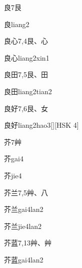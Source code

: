 \begin{Entry}{良}{7}{⾉}
  \begin{Phonetics}{良}{liang2}
  \end{Phonetics}
\end{Entry}

\begin{Entry}{良心}{7,4}{⾉、⼼}
  \begin{Phonetics}{良心}{liang2xin1}
  \end{Phonetics}
\end{Entry}

\begin{Entry}{良田}{7,5}{⾉、⽥}
  \begin{Phonetics}{良田}{liang2tian2}
  \end{Phonetics}
\end{Entry}

\begin{Entry}{良好}{7,6}{⾉、⼥}
  \begin{Phonetics}{良好}{liang2hao3}[][HSK 4]
  \end{Phonetics}
\end{Entry}

\begin{Entry}{芥}{7}{⾋}
  \begin{Phonetics}{芥}{gai4}
  \end{Phonetics}
  \begin{Phonetics}{芥}{jie4}
  \end{Phonetics}
\end{Entry}

\begin{Entry}{芥兰}{7,5}{⾋、⼋}
  \begin{Phonetics}{芥兰}{gai4lan2}
  \end{Phonetics}
  \begin{Phonetics}{芥兰}{jie4lan2}
  \end{Phonetics}
\end{Entry}

\begin{Entry}{芥蓝}{7,13}{⾋、⾋}
  \begin{Phonetics}{芥蓝}{gai4lan2}
  \end{Phonetics}
\end{Entry}

